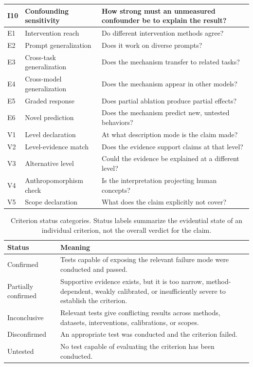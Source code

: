 \documentclass{article}
\begin{document}
\begin{table}[H]
\begin{tabular}{@{}llp{8.5cm}@{}}
I10 & Confounding sensitivity & How strong must an unmeasured confounder be to explain the result? \\
\midrule
E1 & Intervention reach & Do different intervention methods agree? \\
E2 & Prompt generalization & Does it work on diverse prompts? \\
E3 & Cross-task generalization & Does the mechanism transfer to related tasks? \\
E4 & Cross-model generalization & Does the mechanism appear in other models? \\
E5 & Graded response & Does partial ablation produce partial effects? \\
E6 & Novel prediction & Does the mechanism predict new, untested behaviors? \\
\midrule
V1 & Level declaration & At what description mode is the claim made? \\
V2 & Level-evidence match & Does the evidence support claims at that level? \\
V3 & Alternative level & Could the evidence be explained at a different level? \\
V4 & Anthropomorphism check & Is the interpretation projecting human concepts? \\
V5 & Scope declaration & What does the claim explicitly not cover? \\
\bottomrule
\end{tabular}
\end{table}
\endgroup




\begingroup
{}
\begin{table}[H]
\centering
\small
\caption{Criterion status categories. Status labels summarize the evidential state of an individual criterion, not the overall verdict for the claim.}
\label{tab:criterion-status}
\renewcommand{\arraystretch}{1.15}
\begin{tabular}{@{}lp{10.5cm}@{}}
\toprule
\textbf{Status} & \textbf{Meaning} \\
\midrule
Confirmed & Tests capable of exposing the relevant failure mode were conducted and passed. \\
\midrule
Partially confirmed  & Supportive evidence exists, but it is too narrow, method-dependent, weakly calibrated, or insufficiently severe to establish the criterion. \\
\midrule
Inconclusive & Relevant tests give conflicting results across methods, datasets, interventions, calibrations, or scopes. \\
\midrule
Disconfirmed & An appropriate test was conducted and the criterion failed. \\
\midrule
Untested & No test capable of evaluating the criterion has been conducted. \\
\bottomrule
\end{tabular}
\end{table}
\endgroup
\end{document}
